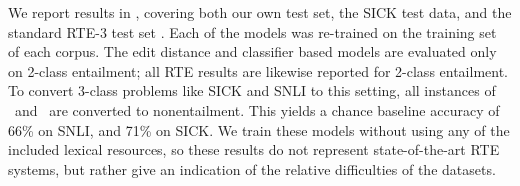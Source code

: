 We report results in , covering both our own test set,
  the SICK test data, and the standard RTE-3 test set \cite{giampiccolo2007third}.
Each of the models was re-trained on the training set of each corpus.
The edit distance and classifier based models are evaluated only on
  2-class entailment; all RTE results are likewise reported for 2-class entailment.
To convert 3-class problems like SICK and SNLI to this setting, all instances
  of \contradiction\ and \unknown\ are converted to nonentailment.
This yields a chance baseline accuracy of 66\% on SNLI, and 71\% on SICK.
We train these models without using any of the included lexical
  resources, so these results do not represent state-of-the-art
  RTE systems, but rather give an indication of the relative
  difficulties of the datasets.


%
%
